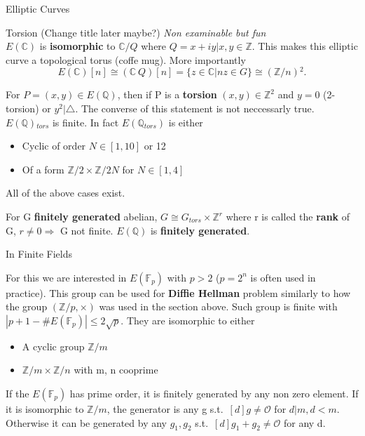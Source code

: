 \documentclass[12pt, letterpaper]{article}
\begin{document}
\begin{section}{Elliptic Curves}
\begin{subsection}{Torsion (Change title later maybe?)}
    \textit{Non examinable but fun} \\
    \(E(\mathbb{C})\) is \textbf{isomorphic} to \(\mathbb{C} / Q\) where
    \(Q = {x + iy | x, y \in \mathbb{Z}}\). This makes this elliptic curve a
    topological torus (coffe mug). More importantly
    \[E(\mathbb{C})[n] \cong (\mathbb{C} \ Q)[n] = \{z \in \mathbb{C}
      | nz \in G\} \cong (\mathbb{Z} / n){}^{2}.\]

    For \(P = (x, y) \in E(\mathbb{Q})\), then if P is a \textbf{torsion}
    \((x, y) \in \mathbb{Z}^{2}\) and \(y = 0\) (2-torsion) or \(y^{2} |
    \triangle\). The converse of this statement is not neccessarly true.
    \(E(\mathbb{Q}){}_{tors}\) is finite. In fact \(E(\mathbb{Q}{}_{tors})\) is
    either
    \begin{itemize}
      \item Cyclic of order \(N \in [1, 10]\) or 12
      \item Of a form \(\mathbb{Z} / 2 \times \mathbb{Z} / 2N\) for \(N \in
            [1, 4]\)
    \end{itemize}
    All of the above cases exist.

    For G \textbf{finitely generated} abelian, \(G \cong G_{tors} \times
    \mathbb{Z}^{r}\) where r is called the \textbf{rank} of G, \(r \neq 0
    \Rightarrow\) G not finite. \(E(\mathbb{Q})\) is
    \textbf{finitely generated}.


  \end{subsection}

  \begin{subsection}{In Finite Fields}

    For this we are interested in \(E(\mathbb{F}_{p})\) with \(p > 2\)
    (\(p = 2^{n}\) is often used in practice). This group can be used for
    \textbf{Diffie Hellman} problem similarly to how the group
    \((\mathbb{Z} / p, \times)\) was used in the section above. Such group is
    finite with \(| p + 1 - \# E(\mathbb{F}_{p}) | \leq 2 \sqrt{p}\). They are
    isomorphic to either
    \begin{itemize}
      \item A cyclic group \(\mathbb{Z} / m\)
      \item \(\mathbb{Z} / m \times \mathbb{Z} / n\) with m, n cooprime
    \end{itemize}

    If the \(E(\mathbb{F}_{p})\) has prime order, it is finitely generated by
    any non zero element. If it is isomorphic to \(\mathbb{Z} / m\), the
    generator is any g s.t.\ \([d]g \neq \mathcal{O}\) for \(d | m, d < m\).
    Otherwise it can be generated by any \(g_{1}, g_{2}\) s.t.\ \([d]g_{1} +
    g_{2} \neq \mathcal{O}\) for any d.


\end{subsection}
\end{section}
\end{document}

